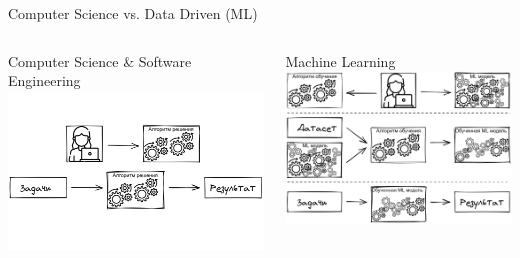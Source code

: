 \documentclass[aspectratio=169, professionalfonts]{beamer}
\begin{document}
\begin{frame}{Computer Science vs. Data Driven (ML)}
    \begin{columns}[T]
        \begin{column}{.49\linewidth}
            \centering
            Computer Science \& Software Engineering
            \includegraphics[width=\linewidth]{graphs/fig1_1.jpg}
        \end{column}
        \begin{column}{.49\linewidth}
            \centering
            Machine Learning
            \includegraphics[width=\linewidth]{graphs/fig1_2.jpg}
        \end{column}
    \end{columns}
\end{frame}
\end{document}
